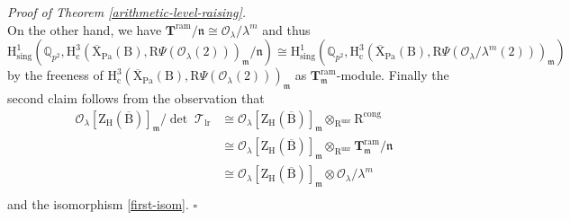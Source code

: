 \documentclass[10pt]{amsart}
\numberwithin{equation}{section}
\theoremstyle{definition}
\newenvironment{myproof}[2] {\emph{Proof of {#1} {#2}.}}{\hfill$\square$}
\def\lr{\mathrm{lr}}
\def\ram{\mathrm{ram}}
\def\Pa{\mathrm{Pa}}
\def\sing{\mathrm{sing}}
\def\calO{\mathcal{O}}
\def\calT{\mathcal{T}}
\def\fracm{\mathfrak{m}}
\def\fracn{\mathfrak{n}}
\def\QQ{\mathbb{Q}}
\def\bfT{\mathbf{T}}
\def\rmB{\mathrm{B}}
\def\rmH{\mathrm{H}}
\def\rmR{\mathrm{R}}
\def\rmX{\mathrm{X}}
\def\rmZ{\mathrm{Z}}
\def\unr{\mathrm{unr}}
\begin{document}
\begin{myproof}{Theorem}{\ref{arithmetic-level-raising}}
\begin{equation*}
\end{equation*}
On the other hand, we have $\bfT^{\ram}/\fracn\cong \calO_{\lambda}/\lambda^{m}$ and thus 
\begin{equation*}
\mathrm{H}^{1}_{\sing}({\QQ_{p^{2}}}, \rmH^{3}_{\mathrm{c}}(\overline{\rmX}_{\Pa}(\rmB), \rmR\Psi(\calO_{\lambda}(2)))_{\fracm}/\fracn)\cong \mathrm{H}^{1}_{\sing}({\QQ_{p^{2}}}, \rmH^{3}_{\mathrm{c}}(\overline{\rmX}_{\Pa}(\rmB), \rmR\Psi(\calO_{\lambda}/\lambda^{m}(2)))_{\fracm})
\end{equation*}
by the freeness of $ \rmH^{3}_{\mathrm{c}}(\overline{\rmX}_{\Pa}(\rmB), \rmR\Psi(\calO_{\lambda}(2)))_{\fracm}$ as $\bfT^{\ram}_{\fracm}$-module. 
Finally the second claim follows from the observation that 
\begin{equation*}
\begin{aligned}
\calO_{\lambda}[\rmZ_{\rmH}(\overline{\rmB})]_{\fracm}/\det\phantom{.}\calT_{\lr}&\cong  \calO_{\lambda}[\rmZ_{\rmH}(\overline{\rmB})]_{\fracm}\otimes_{\rmR^{\unr}}\rmR^{\mathrm{cong}}\\
&\cong  \calO_{\lambda}[\rmZ_{\rmH}(\overline{\rmB})]_{\fracm}\otimes_{\rmR^{\unr}}\bfT^{\ram}_{\fracm}/\fracn\\
&\cong  \calO_{\lambda}[\rmZ_{\rmH}(\overline{\rmB})]_{\fracm}\otimes \calO_{\lambda}/\lambda^{m}\\
\end{aligned}
\end{equation*}
and the isomorphism \ref{first-isom}.
\end{myproof}
\end{document}
